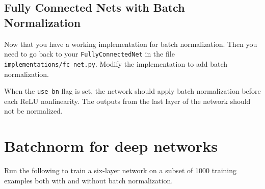 \documentclass[11pt]{article}
\begin{document}
    \hypertarget{fully-connected-nets-with-batch-normalization}{%
\subsection{Fully Connected Nets with Batch
Normalization}\label{fully-connected-nets-with-batch-normalization}}

Now that you have a working implementation for batch normalization. Then
you need to go back to your \texttt{FullyConnectedNet} in the file
\texttt{implementations/fc\_net.py}. Modify the implementation to add
batch normalization.

When the \texttt{use\_bn} flag is set, the network should apply batch
normalization before each ReLU nonlinearity. The outputs from the last
layer of the network should not be normalized.

    \hypertarget{batchnorm-for-deep-networks}{%
\section{Batchnorm for deep
networks}\label{batchnorm-for-deep-networks}}

Run the following to train a six-layer network on a subset of 1000
training examples both with and without batch normalization.
\end{document}
